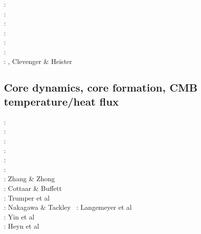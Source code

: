 \begin{scriptsize}
\twothousandfourteen: \cite{thmk14}\cite{mabl14}\cite{lopp14}\cite{stlh14}\\
\twothousandfifteen: \cite{lelk15}\cite{rumi15}\cite{chpe15}\cite{mabl15}\\
\twothousandsixteen: \cite{dumy16}\cite{blmp16}\\
\twothousandseventeen: \cite{robh17}\cite{wisv17}\cite{majc17}\\
\twothousandeighteen: \cite{memm18}\cite{cram18}\\
\twothousandnineteen: \cite{liki19}\cite{demh19}\cite{galb19}\cite{frtv19}\cite{yuwa19}\cite{ropu19}\\
\twothousandtwenty: \cite{homb20}\cite{trlb20}\cite{gadb20}\cite{jaca20a,jaca20b}, Clevenger \& Heister \cite{clhe20}
\end{scriptsize}

\subsection{Core dynamics, core formation, CMB temperature/heat flux}

\begin{scriptsize}
\nineteenninetysix: \cite{hayu96}\cite{boeh96}\\
\nineteenninetyeight: \cite{vayu98}\\
\twothousandfour: \cite{nata04c}\\
\twothousandeight: \cite{lahb08}\cite{gost08}\cite{sata08}\\
\twothousandnine: \cite{kisn09}\\
\twothousandten: \cite{nata10}\cite{lamg10}\cite{sate10}\\
\twothousandeleven: Zhang \& Zhong  \cite{zhzh11}\\
\twothousandtwelve: Cottaar \& Buffett  \cite{cobu12}\\
\twothousandtwelve: Trumper et al  \cite{trbh12}\\
\twothousandthirteen: Nakagawa \& Tackley  \cite{nata13}\
\twothousandeighteen: Langemeyer et al  \cite{lalt18}\\
\twothousandnineteen: Yin et al  \cite{yiym19}\\
\twothousandtwenty: Heyn et al \cite{hect20}
\end{scriptsize}

